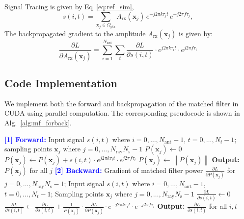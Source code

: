 Signal Tracing is given by Eq~\ref{eq:ref_sim},
\begin{equation*} 
s(i, t) = \sum_{\mathbf{x}_j \in \Omega_\text{pts}} A_{\text{rx}}(\mathbf{x}_j)\, e^{-j 2\pi k \tau_{j} t} \, e^{-j 2\pi f \tau_{j}},
\end{equation*}
The backpropagated gradient to the amplitude $A_{\text{rx}}(\mathbf{x}_j)$ is given by:
\begin{equation} 
\frac{\partial L}{\partial A_{\text{rx}}(\mathbf{x}_j)}=  \sum_{i = 1}^{N_{\text{ant}}} \sum_{t} \frac{\partial L}{\partial s(i, t)} \cdot e^{j 2\pi k \tau_i t} \cdot e^{j 2\pi f \tau_i}
\end{equation}
\subsection{Code Implementation}
\label{sec:app-alg}
We implement both the forward and backpropagation of the matched filter in CUDA using parallel computation. The corresponding pseudocode is shown in Alg.~\ref{alg:mf_forback}.

\begin{algorithm}[H]
\caption{Differentiable Matched Filter Algorithm}
\begin{algorithmic}
\State \textbf{\textcolor{blue}{[1] Forward:}} Input signal $s(i, t)$ where $i = 0, \ldots, N_{\text{ant}} - 1$, $t = 0, \ldots, N_t - 1$;
\State sampling points $\mathbf{x}_j$ where $j = 0, \ldots, N_{\text{ray}} N_{\text{s}} - 1$
    \State $P(\mathbf{x}_j) \gets 0$
            \State $P(\mathbf{x}_j) \gets P(\mathbf{x}_j) + s(i, t) \cdot e^{j 2\pi k \tau_i t} \cdot e^{j 2\pi f \tau_i}$
        \EndFor
    \EndFor
    \State $P(\mathbf{x}_j) \gets \left\lVert P(\mathbf{x}_j) \right\rVert$
\EndFor
\State \textbf{Output:} $P(\mathbf{x}_j)$ for all $j$
\vspace{0.5em}
\State \textbf{\textcolor{blue}{[2] Backward:}} Gradient of matched filter power $\frac{\partial L}{\partial P(\mathbf{x}_j)}$ for $j = 0, \ldots, N_{\text{ray}} N_{\text{s}} - 1$;
\State Input signal $s(i, t)$ where $i = 0, \ldots, N_{\text{ant}} - 1$, $t = 0, \ldots, N_t - 1$;
\State Sampling points $\mathbf{x}_j$ where $j = 0, \ldots, N_{\text{ray}} N_{\text{s}} - 1$
        \State $\frac{\partial L}{\partial s(i, t)} \gets 0$
            \State $\frac{\partial L}{\partial s(i, t)} \gets \frac{\partial L}{\partial s(i, t)} + \frac{1}{P(\mathbf{x}_j)} \cdot \frac{\partial L}{\partial P(\mathbf{x}_j)} \cdot e^{-j 2\pi k \tau_i t} \cdot e^{-j 2\pi f \tau_i}$
        \EndFor
    \EndFor
\EndFor
\State \textbf{Output:} $\frac{\partial L}{\partial s(i, t)}$ for all $i, t$
\end{algorithmic}
\label{alg:mf_forback}
\end{algorithm}

